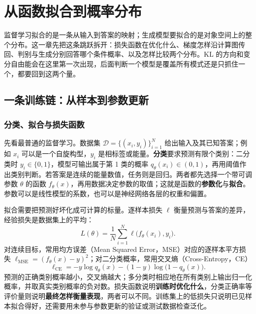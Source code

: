 \chapter{从函数拟合到概率分布}
\label{chap:probability-language}

\begin{keybox}[从拟合函数到拟合分布]
监督学习拟合的是一条从输入到答案的映射；生成模型要拟合的是对象空间上的整个分布。这一章先把这条跳跃拆开：损失函数在优化什么、梯度怎样沿计算图传回、判别与生成分别回答哪个条件概率、以及怎样比较两个分布。KL 的方向和变分自由能会在这里第一次出现，后面判断一个模型是覆盖所有模式还是只抓住一个，都要回到这两个量。
\end{keybox}

\section{一条训练链：从样本到参数更新}

\subsection{分类、拟合与损失函数}

先看最普通的监督学习。数据集 \(\mathcal D=\{(x_i,y_i)\}_{i=1}^N\) 给出输入及其已知答案；例如 \(x_i\) 可以是一个自旋构型，\(y_i\) 是相标签或能量。\textbf{分类}要求预测有限个类别：二分类时 \(y_i\in\{0,1\}\)，模型可输出属于第 1 类的概率 \(q_\theta(x_i)\in(0,1)\)，再用阈值作出类别判断。若答案是连续的能量数值，任务则是回归。两者都先选择一个带可调参数 \(\theta\) 的函数 \(f_\theta(x)\)，再用数据决定参数的取值；这就是函数的\textbf{参数化}与\textbf{拟合}。参数可以是线性模型的系数，也可以是神经网络各层的权重和偏置。

拟合需要把预测好坏化成可计算的标量。逐样本损失 \(\ell\) 衡量预测与答案的差异，经验损失是数据集上的平均：
\begin{equation}
  L(\theta)=\frac{1}{N}\sum_{i=1}^N \ell\bigl(f_\theta(x_i),y_i\bigr).
  \label{eq:basic-empirical-loss}
\end{equation}
对连续目标，常用均方误差（Mean Squared Error，MSE）对应的逐样本平方损失 \(\ell_{\mathrm{MSE}}=(f_\theta(x)-y)^2\)；对二分类概率，常用交叉熵（Cross-Entropy，CE）
\begin{equation}
  \ell_{\mathrm{CE}}=-y\log q_\theta(x)-(1-y)\log\bigl(1-q_\theta(x)\bigr).
  \label{eq:basic-binary-ce}
\end{equation}
预测的正确类别概率越小，交叉熵越大；多分类时相应地在所有类别上输出归一化概率，并取真实类别概率的负对数。损失函数说明\textbf{训练时优化什么}，分类正确率等评价量则说明\textbf{最终怎样衡量表现}，两者可以不同。训练集上的低损失只说明已见样本拟合得好，还需要用未参与参数更新的验证或测试数据检查泛化。

